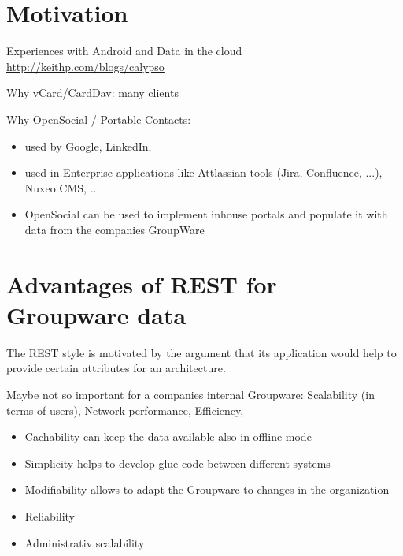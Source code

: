 \documentclass[12pt,a4paper]{scrartcl}		%
\begin{document}
\title{}
\subtitle{}
\author{Thomas Koch\\\url{thomas@koch.ro}\\matriculation number 7250371}
\publishers{Fernuniversität Hagen\\Faculty of mathematics and computer science}
\date{\today}
\maketitle{}

\tableofcontents{}
\begin{abstract}

\end{abstract}
\newpage{}

\section{Motivation}

Experiences with Android and Data in the cloud
\url{http://keithp.com/blogs/calypso}

Why vCard/CardDav: many clients

Why OpenSocial / Portable Contacts:
\begin{itemize}
\item used by Google, LinkedIn,
\item used in Enterprise applications like Attlassian tools (Jira, Confluence, ...), Nuxeo CMS, ...
\item OpenSocial can be used to implement inhouse portals and populate it with data from the companies GroupWare
\end{itemize}


\section{Advantages of REST for Groupware data}

The REST style is motivated by the argument that its application would help to provide certain attributes for an architecture.\cite[sec 5.1]{Fielding2000}

Maybe not so important for a companies internal Groupware: Scalability (in terms of users), Network performance, Efficiency, 

\begin{itemize}
\item Cachability can keep the data available also in offline mode
\item Simplicity helps to develop glue code between different systems
\item Modifiability allows to adapt the Groupware to changes in the organization
\item Reliability
\item Administrativ scalability
\end{itemize}
\end{document}

